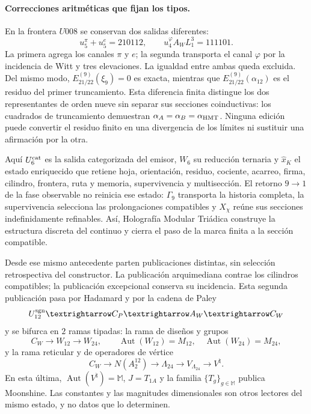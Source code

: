 \paragraph{Correcciones aritméticas que fijan los tipos.}
En la frontera \(U008\) se conservan dos salidas diferentes:
\[
 u_5^\pi+u_5^e=210112,
 \qquad
 u_4^\varphi A_WL_1^3=111101.
\]
La primera agrega los canales \(\pi\) y \(e\); la segunda transporta el
canal \(\varphi\) por la incidencia de Witt y tres elevaciones. La igualdad
entre ambas queda excluida. Del mismo modo,
\(E_{21/22}^{(9)}(\xi_9)=0\) es exacta, mientras que
\(E_{21/22}^{(9)}(\alpha_{12})\) es el residuo del primer truncamiento. Esta
diferencia finita distingue los dos representantes de orden nueve sin separar
sus secciones coinductivas: los cuadrados de truncamiento demuestran
\(\alpha_A=\alpha_B=\alpha_{\rm HMT}\). Ninguna edición puede convertir el
residuo finito en una divergencia de los límites ni sustituir una afirmación
por la otra.

Aquí \(U_6^{\rm cat}\) es la salida categorizada del emisor, \(W_6\) su
reducción ternaria y \(\widehat x_K\) el estado enriquecido que retiene hoja,
orientación, residuo, cociente, acarreo, firma, cilindro, frontera, ruta y
memoria, supervivencia y multisección. El retorno \(9\to1\) de la fase
observable no reinicia ese estado:
\(\Gamma_9\) transporta la historia completa, la supervivencia selecciona
las prolongaciones compatibles y \(X_\chi\) reúne sus secciones
indefinidamente refinables. Así, Holografía Modular Triádica construye la
estructura discreta del continuo y cierra el paso de la marca finita a la
sección compatible.

Desde ese mismo antecedente parten publicaciones distintas, sin selección
retrospectiva del constructor. La publicación arquimediana contrae los
cilindros compatibles; la publicación excepcional conserva su incidencia.
Esta segunda publicación pasa por Hadamard y por la cadena de Paley
\[
 U_{12}^{\rm sgn}\longrightarrow C_P\longrightarrow A_W
 \longrightarrow C_W
\]
y se bifurca en \(2\) ramas tipadas: la rama de diseños y grupos
\[
 C_W\longrightarrow W_{12}\longrightarrow W_{24},
 \qquad
 \operatorname{Aut}(W_{12})=M_{12},\quad
 \operatorname{Aut}(W_{24})=M_{24},
\]
y la rama reticular y de operadores de vértice
\[
 C_W\longrightarrow N(A_2^{12})\longrightarrow\Lambda_{24}
 \longrightarrow V_{\Lambda_{24}}\longrightarrow V^\natural .
\]
En esta última, \(\operatorname{Aut}(V^\natural)=\mathbb M\),
\(J=T_{1A}\) y la familia \(\{T_g\}_{g\in\mathbb M}\) publica Moonshine. Las constantes y
las magnitudes dimensionales son otros lectores del mismo estado, y no datos
que lo determinen.

